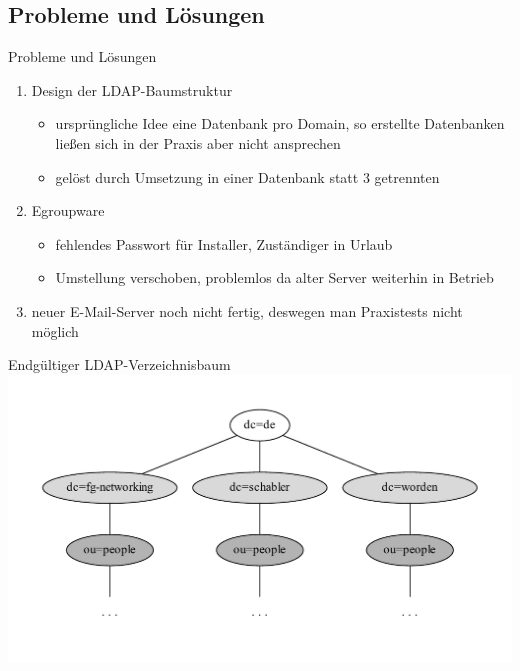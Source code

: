 \documentclass[handout,svgnames]{beamer}
\begin{document}
\subsection{Probleme und Lösungen}
\begin{frame}{Probleme und Lösungen}
\begin{enumerate}
	\item Design der LDAP-Baumstruktur
	\begin{itemize}
		\item ursprüngliche Idee eine Datenbank pro Domain, so erstellte Datenbanken ließen sich in der Praxis aber nicht ansprechen
		\item gelöst durch Umsetzung in einer Datenbank statt 3 getrennten
	\end{itemize}
	\item Egroupware
	\begin{itemize}
		\item fehlendes Passwort für Installer, Zuständiger in Urlaub
		\item Umstellung verschoben, problemlos da alter Server weiterhin in Betrieb
	\end{itemize}
	\item neuer E-Mail-Server noch nicht fertig, deswegen man Praxistests nicht möglich
\end{enumerate}
\end{frame}

\begin{frame}{Endgültiger LDAP-Verzeichnisbaum}
		\includegraphics[width=\textwidth]{Bilder/LDAP-fgn.pdf}
\end{frame}
\end{document}
